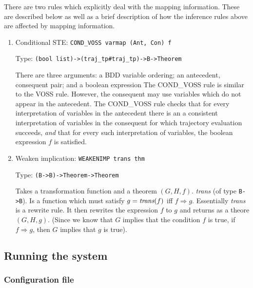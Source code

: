 


\noindent
There are two rules which explicitly deal with the mapping
information. These are described below as well as a brief description
of how the inference rules above are affected by mapping information.

\begin{enumerate}




\item
Conditional STE: {\tt COND\_VOSS varmap (Ant,  Con) f}

Type: {\tt (bool list)->(traj\_tp\#traj\_tp)->B->Theorem}

There are three arguments: a BDD variable ordering; an
antecedent, consequent pair; and a boolean expression
The COND\_VOSS rule is similar to the VOSS rule. However, 
the consequent may use variables which do not appear in the 
antecedent. The COND\_VOSS rule checks that for every
interpretation of variables in the antecedent there is an
a consistent interpretation of variables in the consequent 
for which trajectory evaluation succeeds, {\em and} that
for every such interpretation of variables, the boolean
expression $f$ is satisfied.


  
\item Weaken implication: {\tt WEAKENIMP trans thm}

Type: {\tt (B->B)->Theorem->Theorem}

Takes a transformation function and a theorem $(G, H, f)$.
{\it trans} (of type {\tt B->B}). Is a function which must
satisfy $g = \mbox{\it trans}(f)$ iff $f \Rightarrow g$.
Essentially {\it trans} is a rewrite rule. It then rewrites
the expression $f$ to $g$ and returns as a theore $(G, H, g)$.
(Since we know that $G$ implies that the condition $f$ is
true, if $f \Rightarrow g$, then $G$ implies that $g$ is true).



\end{enumerate}

\subsection{Running the system}

\subsubsection{Configuration file}

